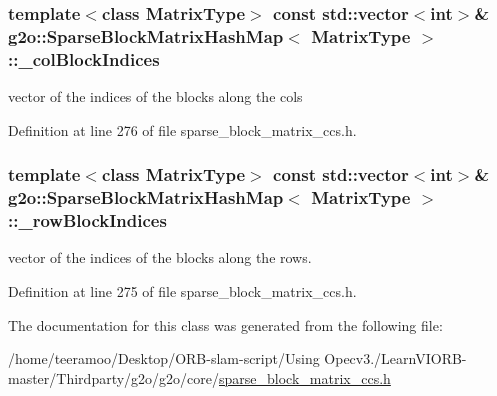 \subsubsection[{\texorpdfstring{\+\_\+col\+Block\+Indices}{_colBlockIndices}}]{\setlength{\rightskip}{0pt plus 5cm}template$<$class Matrix\+Type$>$ const std\+::vector$<$int$>$\& {\bf g2o\+::\+Sparse\+Block\+Matrix\+Hash\+Map}$<$ Matrix\+Type $>$\+::\+\_\+col\+Block\+Indices\hspace{0.3cm}{\ttfamily [protected]}}\hypertarget{classg2o_1_1SparseBlockMatrixHashMap_a1def3b2ef5c5ee646d831cda7b1954be}{}\label{classg2o_1_1SparseBlockMatrixHashMap_a1def3b2ef5c5ee646d831cda7b1954be}


vector of the indices of the blocks along the cols 



Definition at line 276 of file sparse\+\_\+block\+\_\+matrix\+\_\+ccs.\+h.

\subsubsection[{\texorpdfstring{\+\_\+row\+Block\+Indices}{_rowBlockIndices}}]{\setlength{\rightskip}{0pt plus 5cm}template$<$class Matrix\+Type$>$ const std\+::vector$<$int$>$\& {\bf g2o\+::\+Sparse\+Block\+Matrix\+Hash\+Map}$<$ Matrix\+Type $>$\+::\+\_\+row\+Block\+Indices\hspace{0.3cm}{\ttfamily [protected]}}\hypertarget{classg2o_1_1SparseBlockMatrixHashMap_ab002c32872fbce7d3485a5032eaee0de}{}\label{classg2o_1_1SparseBlockMatrixHashMap_ab002c32872fbce7d3485a5032eaee0de}


vector of the indices of the blocks along the rows. 



Definition at line 275 of file sparse\+\_\+block\+\_\+matrix\+\_\+ccs.\+h.



The documentation for this class was generated from the following file\+:\begin{DoxyCompactItemize}
\item 
/home/teeramoo/\+Desktop/\+O\+R\+B-\/slam-\/script/\+Using Opecv3./\+Learn\+V\+I\+O\+R\+B-\/master/\+Thirdparty/g2o/g2o/core/\hyperlink{sparse__block__matrix__ccs_8h}{sparse\+\_\+block\+\_\+matrix\+\_\+ccs.\+h}\end{DoxyCompactItemize}
